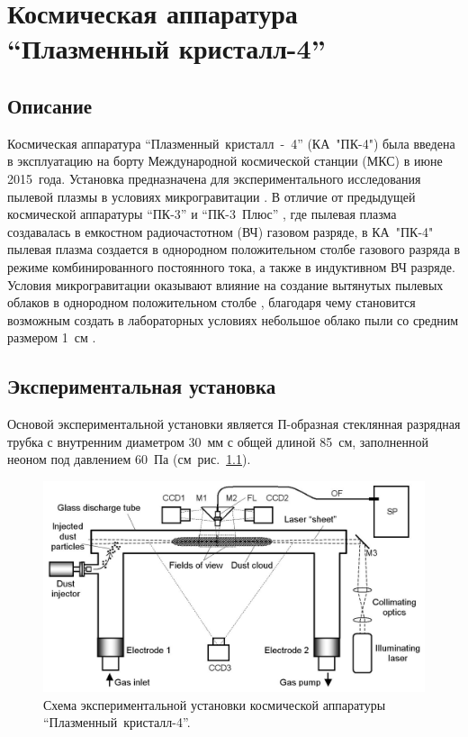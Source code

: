 \chapter{Космическая аппаратура “Плазменный кристалл-4”}
\label{cha:ch_3}
\section{Описание}
\label{sec:sec_31}
Космическая аппаратура “Плазменный~кристалл~-~4” (КА~"ПК-4") была введена в эксплуатацию на борту
Международной космической станции (МКС) в июне 2015~года. Установка предназначена для экспериментального
исследования пылевой плазмы в условиях микрогравитации \cite{Pustylnik}. В отличие от предыдущей космической аппаратуры
“ПК-3” \cite{Nefedov} и “ПК-3~Плюс” \cite{Thomas}, где пылевая плазма создавалась в емкостном радиочастотном (ВЧ) газовом разряде,
в КА~"ПК-4" пылевая плазма создается в однородном положительном столбе газового разряда в режиме
комбинированного постоянного тока, а также в индуктивном ВЧ разряде. Условия микрогравитации оказывают
влияние на создание вытянутых пылевых облаков в однородном положительном столбе \cite{Usachev},
благодаря чему становится возможным создать в лабораторных условиях небольшое облако пыли со средним размером 1~см \cite{Fortov}.

\section{Экспериментальная установка}
Основой экспериментальной установки является П-образная стеклянная разрядная трубка с внутренним диаметром 30~мм
с общей длиной 85~см, заполненной неоном под давлением 60~Па (см~рис.~\ref{fig:fig31}).

\begin{figure}
  \centering
  \includegraphics[width=12cm]{figures/fig31}
  \caption{Схема экспериментальной установки космической аппаратуры “Плазменный~кристалл-4”.}
  \label{fig:fig31}
\end{figure}

